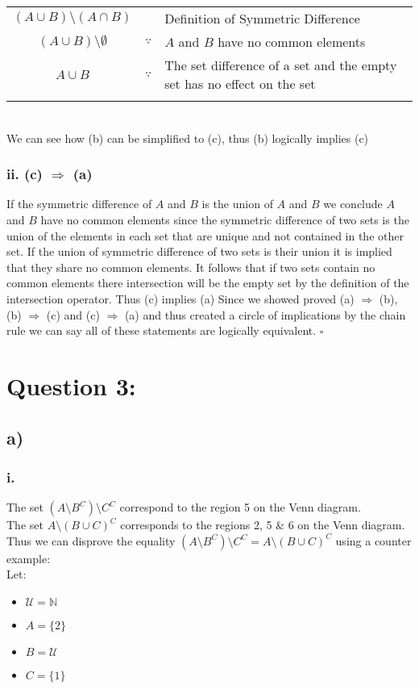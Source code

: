 \documentclass{article}
\begin{document}
\begin{table}[htp]
    \centering
    \begin{tabular}{ccl}
        $(A \cup B) \setminus (A\cap B)$ &  & Definition of Symmetric Difference\\
        $(A \cup B) \setminus \emptyset$ & $\because$ & $A$ and $B$ have no common elements\\
        $A\cup B$ & $\because$ & The set difference of a set and the empty set has no effect on the set\\
         &  & \\
    \end{tabular}
\end{table}
 \\
 We can see how (b) can be simplified to (c), thus (b) logically implies (c)
 \subsubsection*{ii. (c) $\Rightarrow$ (a)}
 If the symmetric difference of $A$ and $B$ is the union of $A$ and $B$ we conclude $A$ and $B$ have no common elements since the symmetric difference of two sets is the union of the elements in each set that are unique and not contained in the other set. If the union of symmetric difference of two sets is their union it is implied that they share no common elements. \newline
 It follows that if two sets contain no common elements there intersection will be the empty set by the definition of the intersection operator. Thus (c) implies (a)
 \newline
 \newline
 Since we showed proved (a) $\Rightarrow$ (b), (b) $\Rightarrow$ (c) and (c) $\Rightarrow$ (a) and thus created a circle of implications by the chain rule we can say all of these statements are logically equivalent. $\square$

 \newpage
 \section*{Question 3:}
 \subsection*{a)}
 \subsubsection*{i.}
 The set $(A\setminus B^C)\setminus C^C$ correspond to the region 5 on the Venn diagram.\\
 The set $A\setminus(B\cup C)^C$ corresponds to the regions 2, 5 \& 6 on the Venn diagram. \\Thus we can disprove the equality $(A\setminus B^C)\setminus C^C = A\setminus(B\cup C)^C$ using a counter example:\\
 Let:\begin{itemize}
     \item $\mathcal{U}=\mathbb{N}$
     \item $A=\{2\}$
     \item $B=\mathcal{U}$
     \item $C=\{1\}$
 \end{itemize}
\end{document}
